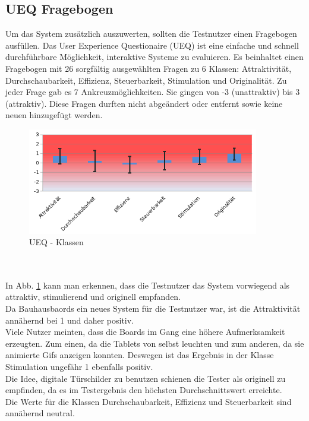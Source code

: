 \subsection{UEQ Fragebogen}\label{UEQ Fragebogen}
Um das System zusätzlich auszuwerten, sollten die Testnutzer einen Fragebogen ausfüllen.
Das User Experience Questionaire (UEQ) ist eine einfache und schnell durchführbare Möglichkeit, interaktive Systeme zu evaluieren.
Es beinhaltet einen Fragebogen mit 26 sorgfältig ausgewählten Fragen zu 6 Klassen: Attraktivität, Durchschaubarkeit, Effizienz, Steuerbarkeit, Stimulation und Originalität.
Zu jeder Frage gab es 7 Ankreuzmöglichkeiten. Sie gingen von -3 (unattraktiv) bis 3 (attraktiv).
Diese Fragen durften nicht abgeändert oder entfernt sowie keine neuen hinzugefügt werden.
\begin{figure}[h!]
  \centering
    \includegraphics[width=0.9\textwidth]{./img/UEQ_Scales.png}
  \caption{UEQ - Klassen}
  \label{img:UEQScales}
\end{figure}
\\
\\
In Abb. \ref{img:UEQScales} kann man erkennen, dass die Testnutzer das System vorwiegend als attraktiv, stimulierend und originell empfanden.
\\
Da Bauhausbaords ein neues System für die Testnutzer war, ist die Attraktivität annähernd bei 1 und daher positiv.
\\
Viele Nutzer meinten, dass die Boards im Gang eine höhere Aufmerksamkeit erzeugten.
Zum einen, da die Tablets von selbst leuchten und zum anderen, da sie animierte Gifs anzeigen konnten.
Deswegen ist das Ergebnis in der Klasse Stimulation ungefähr 1 ebenfalls positiv.
\\
Die Idee, digitale Türschilder zu benutzen schienen die Tester als originell zu empfinden, da es im Testergebnis den höchsten Durchschnittswert erreichte.
\\
Die Werte für die Klassen Durchschaubarkeit, Effizienz und Steuerbarkeit sind annähernd neutral.
